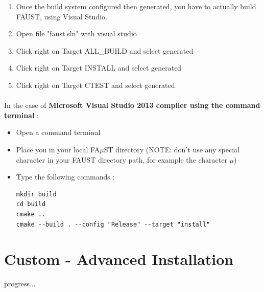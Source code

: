 \begin{enumerate}
\item Once the build system configured then generated, you have to actually build FAUST, using Visual Studio.
\item Open file "faust.sln" with visual studio 
\item Click right on Target ALL\_BUILD and select generated 
\item Click right on Target INSTALL and select generated 
\item Click right on Target CTEST and select generated 
\end{enumerate}



\paragraph{}In the case of \textbf{Microsoft Visual Studio 2013 compiler using the command terminal} :

\begin{itemize}
\item Open a command terminal
\item Place you in your local FA$\mu$ST directory (NOTE: don't use any special character in your FAUST directory path, for example the character $\mu$)
\item Type the following commands : 

\begin{lstlisting}
mkdir build
cd build
cmake .. 
cmake --build . --config "Release" --target "install"
\end{lstlisting}

\end{itemize}

\section{Custom - Advanced Installation}\label{sec:WinCustomInstall}

progress... 



